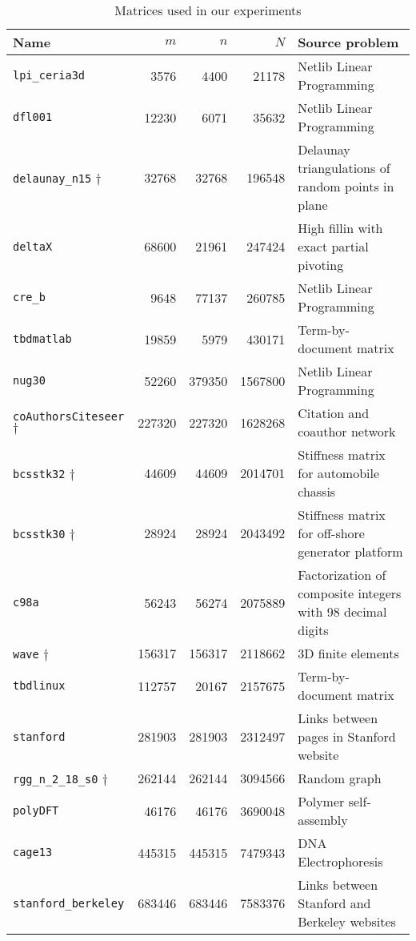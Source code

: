 \begin{table}[h]
	\centering
	\begin{tabular}{|l|r|r|r|p{7cm} |}
		\hline	
		\textbf{Name} & \textbf{$m$} & \textbf{$n$} & \textbf{$N$} & \textbf{Source problem} \\ \hline
		\verb|lpi_ceria3d| 									& 3576 		& 4400 		& 21178 & Netlib Linear Programming \\
		\verb|dfl001| 											& 12230 	& 6071 		& 35632 & Netlib Linear Programming \\ 
		\verb|delaunay_n15| $\dagger$ 			& 32768 	& 32768 	& 196548 & Delaunay triangulations of random points in plane \\ 
		\verb|deltaX| 											& 68600 	& 21961 	& 247424 & High fillin with exact partial pivoting \\
		\verb|cre_b| 												& 9648 		& 77137 	& 260785 & Netlib Linear Programming \\ 
		\verb|tbdmatlab| 										& 19859 	& 5979 		& 430171 & Term-by-document matrix \\ 
		\verb|nug30| 												& 52260 	& 379350 	& 1567800 & Netlib Linear Programming \\ 
		\verb|coAuthorsCiteseer| $\dagger$ 	& 227320 	& 227320 	& 1628268 & Citation and coauthor network\\ 
		\verb|bcsstk32| $\dagger$ 					& 44609 	& 44609 	& 2014701 & Stiffness matrix for automobile chassis \\ 
		\verb|bcsstk30| $\dagger$						& 28924 	& 28924 	& 2043492 & Stiffness matrix for off-shore generator platform \\
		\verb|c98a| 												& 56243 	& 56274 	& 2075889 & Factorization of composite integers with 98 decimal digits  \\ 
		\verb|wave| 	$\dagger$							& 156317 	& 156317 	& 2118662 & 3D finite elements \\
		\verb|tbdlinux| 										& 112757 	& 20167 	& 2157675 & Term-by-document matrix \\
		\verb|stanford| 										& 281903 	& 281903 	& 2312497 & Links between pages in Stanford website \\
		\verb|rgg_n_2_18_s0| $\dagger$ 			& 262144 	& 262144 	& 3094566 & Random graph \\
		\verb|polyDFT| 											& 46176 	& 46176 	& 3690048 & Polymer self-assembly \\ 
		\verb|cage13| 											& 445315 	& 445315 	& 7479343 & DNA Electrophoresis \\
		\verb|stanford_berkeley| 						& 683446 	& 683446 	& 7583376 & Links between Stanford and Berkeley websites \\
		\hline
	\end{tabular}
	\caption{Matrices used in our experiments} \label{tab:matrices}
\end{table}


